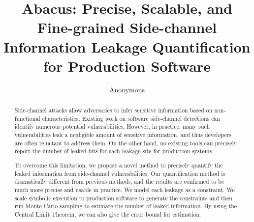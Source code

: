 \documentclass[conference]{IEEEtran}
\newcommand{\tool}{TANA}
\renewcommand{\tool}{CleverHans}
\renewcommand{\tool}{Cygne}
\renewcommand{\tool}{Do-Re-Mi}
\renewcommand{\tool}{Ta-fa Te-fe}
\renewcommand{\tool}{Ti-ri-ti-ri}
\renewcommand{\tool}{Du-Ta-De-Ta}
\renewcommand{\tool}{\textsf{Abacus}}
\begin{document}
\title{\tool{}: Precise, Scalable, and Fine-grained Side-channel Information Leakage Quantification for Production Software}
\author{Anonymous}

\maketitle

\begin{abstract}
    Side-channel attacks allow adversaries to infer sensitive information based
    on non-functional characteristics. Existing work on software side-channel
    detections can identify numerous potential vulnerabilities.
    However, in practice, many such vulnerabilities leak a negligible amount of
    sensitive information, and thus developers are often reluctant to address
    them.
    On the other hand, no existing tools can precisely report the number of
    leaked bits for each leakage site for production systems.

    To overcome this limitation, we propose a novel method to precisely quantify
    the leaked information from side-channel vulnerabilities. Our quantification
    method is dramatically different from previous methods, and the results are
    confirmed to be much more precise and usable in practice. We model each
    leakage as a constraint.
    We scale  symbolic execution to production software to generate the
    constraints
    and then run Monte Carlo sampling to estimate the number of leaked
    information.
    By using
    the Central Limit Theorem, we can also give the error bound for estimation.


\end{abstract}
\end{document}
